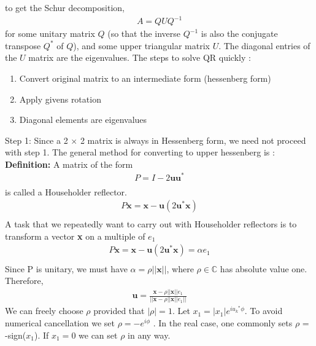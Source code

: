 \documentclass[journal]{IEEEtran}
\begin{document}
to get the Schur decomposition, 
\begin{align}
  A = QUQ^{-1}
\end{align}
for some unitary matrix $Q$ (so that the inverse $Q^{-1}$ is also the conjugate transpose $Q^*$ 
of $Q$), and some upper triangular matrix $U$. The diagonal entries of the $U$ matrix are 
the eigenvalues.
\newline
The steps to solve QR quickly :
\begin{enumerate}
  \item Convert original matrix to an intermediate form (hessenberg form)
  \item Apply givens rotation
  \item Diagonal elements are eigenvalues
\end{enumerate}
Step 1:
\newline
Since a 2 $\times$ 2 matrix is always in Hessenberg form, we need not proceed with step 1.
\newline
The general method for converting to upper hessenberg is :\\
\textbf{Definition: }A matrix of the form
\begin{align}
    P = I - 2\textbf{uu}^*\\
\end{align}
is called a Householder reflector.\\
\begin{align}
    P\textbf{x} = \textbf{x} - \textbf{u}(2\textbf{u}^*\textbf{x})\\
\end{align}
A task that we repeatedly want to carry out with Householder reflectors is to transform
a vector \textbf{x} on a multiple of \textbf{$e_1$}
\begin{align}
    P\textbf{x} = \textbf{x} - \textbf{u}(2\textbf{u}^*\textbf{x}) = \alpha \textbf{$e_1$}\\
\end{align}
Since P is unitary, we must have $\alpha = \rho 
||\textbf{x}||$, where $\rho \in \mathbb{C}$ has absolute value one. Therefore,
\begin{align}
    \textbf{u} = \frac{\textbf{x} - \rho||\textbf{x}||\textbf{$e_1$}}{||\textbf{x} - \rho||\textbf{x}||\textbf{$e_1$}||}
\end{align}
We can freely choose $\rho$ provided that $|\rho| = 1$. Let $x_1 = |x_1|e^{i\textbf{$u_k$}^*\phi}$. To avoid numerical
cancellation we set $\rho = -e^{i\phi}$
.
In the real case, one commonly sets $\rho$ = -sign($x_1$). If $x_1 = 0$ we can set $\rho$ in any way.
\end{document}
